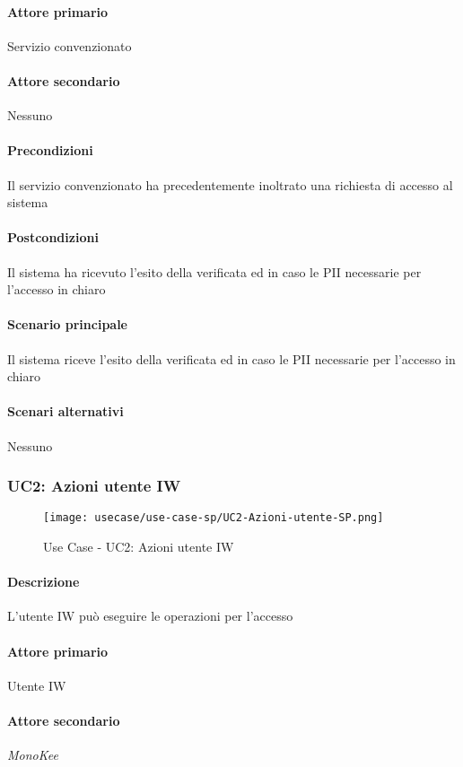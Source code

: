\paragraph{Attore primario}  Servizio convenzionato
\paragraph{Attore secondario}  Nessuno
\paragraph{Precondizioni}  Il servizio convenzionato ha precedentemente inoltrato una richiesta di accesso al sistema
\paragraph{Postcondizioni} Il sistema ha ricevuto l’esito della verificata ed in caso le PII necessarie per l’accesso in chiaro
\paragraph{Scenario principale}  
Il sistema riceve l’esito della verificata ed in caso le PII necessarie per l’accesso in chiaro
\paragraph{Scenari alternativi}  Nessuno



\subsubsection{UC2: Azioni utente IW}
\begin{figure}[!htbp] 
    \centering 
    \texttt{[image: usecase/use-case-sp/UC2-Azioni-utente-SP.png]} 
    \caption{Use Case - UC2: Azioni utente IW}
\end{figure}

\paragraph{Descrizione} L’utente IW può eseguire le operazioni per l’accesso
\paragraph{Attore primario}  Utente IW
\paragraph{Attore secondario}  \textit{MonoKee}
